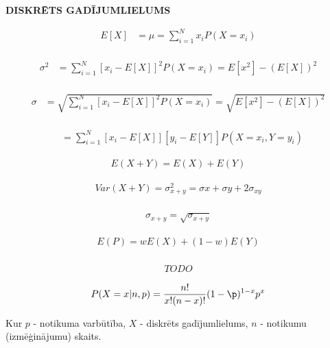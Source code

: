 
\textbf{DISKRĒTS GADĪJUMLIELUMS}

{\begin{align*}
    E[X] &= \mu = \sum_{i=1}^{N}x_iP(X=x_i) \\
\end{align*}}

{\begin{align*}
    \sigma^2 &= \sum_{i=1}^{N}[x_i-E[X]]^2P(X=x_i) = E[x^2] - (E[X])^2 \\
\end{align*}}

{\begin{align*}
    \sigma &= \sqrt{\sum_{i=1}^{N}[x_i-E[X]]^2P(X=x_i)} = \sqrt{E[x^2] - (E[X])^2} \\
\end{align*}}

{\begin{align*}
     &= \sum_{i=1}^{N}[x_i-E[X]][y_i-E[Y]]P(X=x_i, Y=y_i)
\end{align*}}

{\begin{align*}
    E(X+Y) = E(X) + E(Y)
\end{align*}}

{\begin{align*}
    Var(X+Y) = \sigma_{x+y}^2 = \sigma{x} + \sigma{y} + 2\sigma_{xy}\\
\end{align*}}

{\begin{align*}
    \sigma_{x+y} = \sqrt{\sigma_{x+y}} 
\end{align*}}


{\begin{align*}
    E(P)=wE(X)+(1-w)E(Y)\\
\end{align*}}

{\begin{align*}
    TODO
\end{align*}}

{\begin{align*}
    P(X=x | n,p)=\displaystyle\frac{n!}{x!(n-x)!}(1-\p)^{1-x}p^x
\end{align*}

Kur $p$ - notikuma varbūtība, $X$ - diskrēts gadījumlielums, $n$ - notikumu
(izmēģinājumu) skaits.}


